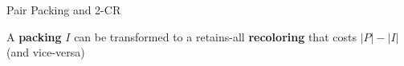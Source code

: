 \begin{frame}{Pair Packing and 2-CR}

\begin{observation}
A \textbf{packing} $I$ can be transformed to a retains-all \textbf{recoloring} that costs 
$|P| - |I|$ {\small(and vice-versa)}
\end{observation}

\end{frame}